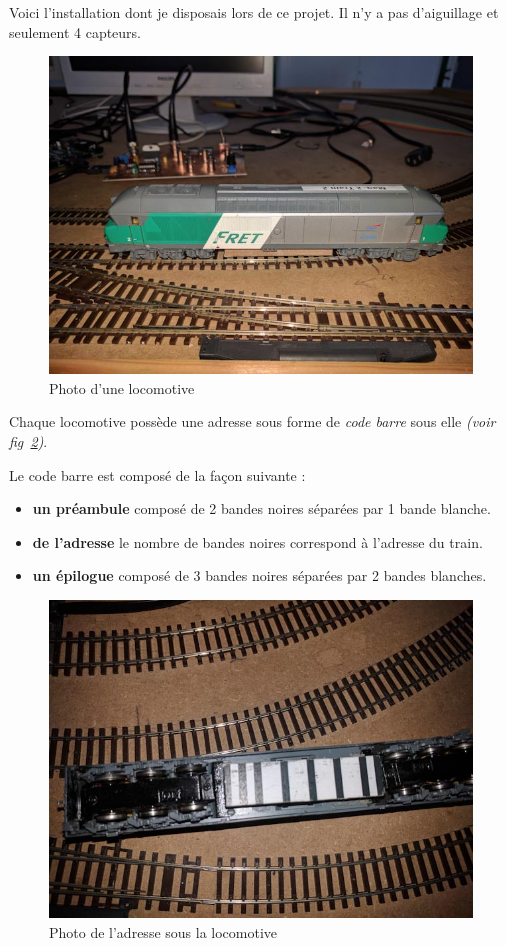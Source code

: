 Voici l'installation dont je disposais lors de ce projet. Il n'y a pas
d'aiguillage et seulement 4 capteurs.


\begin{figure}[h]
\centering
\includegraphics[scale=0.27]{loco.jpg}
\caption{Photo d'une locomotive}
\label{fig5}
\end{figure}

\newpage

Chaque locomotive poss\`ede une adresse sous forme de \emph{code
barre} sous elle \emph{(voir fig~\ref{fig6})}.

Le code barre est compos\'e de la façon suivante :
\begin{itemize}
    \item \textbf{un pr\'eambule} compos\'e de 2 bandes noires
      s\'epar\'ees par 1 bande blanche.
    \item \textbf{de l'adresse} le nombre de bandes noires correspond
      à l'adresse du train. 
    \item \textbf{un \'epilogue} compos\'e de 3 bandes noires
      s\'epar\'ees par 2 bandes blanches.
\end{itemize}

\begin{figure}[h]
\centering
\includegraphics[scale=0.27]{add.jpg}
\caption{Photo de l'adresse sous la locomotive}
\label{fig6}
\end{figure}

